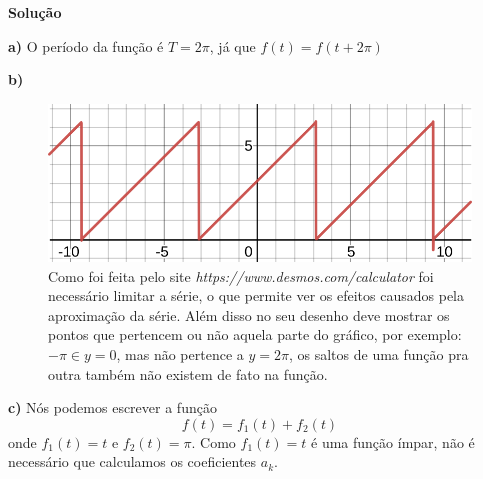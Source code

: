 \linespread{1.5}
\textbf{Solução}

\textbf{a)} O período da função é $T = 2\pi$, já que $f(t) = f(t+2\pi)$

\textbf{b)} 

\begin{figure}[H]
    \centering
    \includegraphics[width = 0.7\linewidth]{fig/sf6b.png}
    \caption{Como foi feita pelo site \textit{https://www.desmos.com/calculator} foi necessário limitar a série, o que permite ver os efeitos causados pela aproximação da série. Além disso no seu desenho deve mostrar os pontos que pertencem ou não aquela parte do gráfico, por exemplo: $-\pi \in y=0$, mas não pertence a $y=2\pi$, os saltos de uma função pra outra também não existem de fato na função.}
\end{figure}

\textbf{c)}
Nós podemos escrever a função \begin{equation}
    \label{eq:sf6cf}
    f(t) = f_1(t) + f_2(t) 
\end{equation} onde $f_1(t) = t$ e $f_2(t) = \pi$. 
Como $f_1(t) = t$ é uma função ímpar, não é necessário que calculamos os coeficientes $a_k$.

